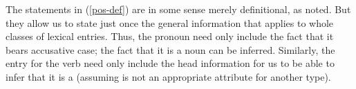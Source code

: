 \documentclass[output=paper
 	        ,biblatex
                ,babelshorthands
                ,newtxmath
                ,draftmode
                ,colorlinks, citecolor=brown
]{langscibook}
\begin{document}

The statements in (\ref{pos-def}) are in some sense merely definitional, as noted.
But they allow us to state just once the general information that applies to whole classes of lexical entries.
Thus, the pronoun  need only include the fact that it bears accusative case; the fact that it is a noun can be inferred. 
Similarly, the entry for the verb  need only include the head information \avm{[aux & $+$]} for us to be able to infer that it is a  (assuming  is not an appropriate attribute for another type).
\end{document}
